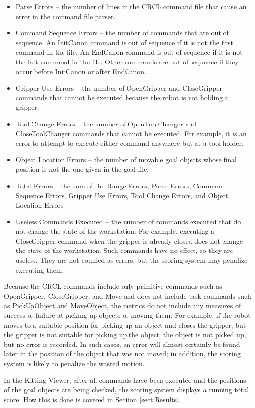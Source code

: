 \begin{itemize}
\item \small \sf Parse Errors \rm \normalsize -- the number of lines in
the CRCL command file that cause an error in the command file
parser.

\item \small \sf Command Sequence Errors \rm \normalsize -- the number of
commands that are out of sequence. An InitCanon command is out of sequence
if it is not the first command in the file. An EndCanon command is out of
sequence if it is not the last command in the file. Other commands are out
of sequence if they occur before InitCanon or after EndCanon.

\item \small \sf Gripper Use Errors \rm \normalsize -- the number of
OpenGripper and CloseGripper commands that cannot be executed because the
robot is not holding a gripper.

\item \small \sf Tool Change Errors \rm \normalsize -- the number of
OpenToolChanger and CloseToolChanger commands that cannot be executed. For
example, it is an error to attempt to execute either command anywhere but
at a tool holder.

\item \small \sf Object Location Errors \rm \normalsize -- the number of
movable goal objects whose final position is not the one given in the goal
file.

\item \small \sf Total Errors \rm \normalsize -- the sum of the Range
Errors, Parse Errors, Command Sequence Errors, Gripper Use Errors, Tool
Change Errors, and Object Location Errors.

\item \small \sf Useless Commands Executed \rm \normalsize -- the number
of commands executed that do not change the state of the workstation. For
example, executing a CloseGripper command when the gripper is already
closed does not change the state of the workstation. Such commands have no
effect, so they are useless. They are not counted as errors, but the
scoring system may penalize executing them.

\end{itemize}

Because the CRCL commands include only primitive commands such as
OpenGripper, CloseGripper, and Move and does not include task commands such
as PickUpObject and MoveObject, the metrics do not include any measures of
success or failure at picking up objects or moving them. For example, if
the robot moves to a suitable position for picking up an object and closes
the gripper, but the gripper is not suitable for picking up the object, the
object is not picked up, but no error is recorded. In such cases, an error
will almost certainly be found later in the position of the object that was
not moved; in addition, the scoring system is likely to penalize the wasted
motion.

In the Kitting Viewer, after all commands have been executed and the
positions of the goal objects are being checked, the scoring system
displays a running total score. How this is done is covered in
Section \ref{sect:Results}.

